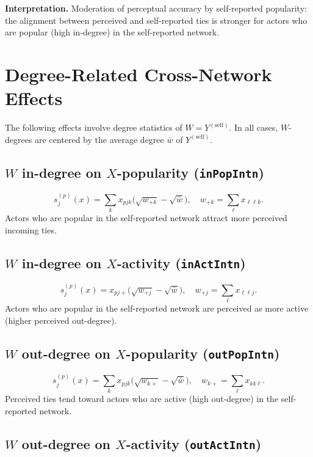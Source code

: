 \documentclass[11pt]{article}
\newcommand{\self}{\mathrm{self}}
\begin{document}
\textbf{Interpretation.}
Moderation of perceptual accuracy by self-reported popularity:
the alignment between perceived and self-reported ties is
stronger for actors who are popular (high in-degree) in the
self-reported network.

\section{Degree-Related Cross-Network Effects}

The following effects involve degree statistics of $W = Y^{(\self)}$.
In all cases, $W$-degrees are centered by the average degree $\bar{w}$ of
$Y^{(\self)}$.

\subsection{$W$ in-degree on $X$-popularity (\texttt{inPopIntn})}

\[
  s_{j}^{(p)}(x) = \sum_{k} x_{pjk}
    \bigl(\sqrt{w_{+k}} - \sqrt{\bar{w}}\bigr),
  \quad
  w_{+k} = \sum_{\ell} x_{\ell\ell k}.
\]
Actors who are popular in the self-reported network attract more perceived
incoming ties.

\subsection{$W$ in-degree on $X$-activity (\texttt{inActIntn})}

\[
  s_{j}^{(p)}(x) = x_{pj+}
    \bigl(\sqrt{w_{+j}} - \sqrt{\bar{w}}\bigr),
  \quad
  w_{+j} = \sum_{\ell} x_{\ell\ell j}.
\]
Actors who are popular in the self-reported network are perceived as more
active (higher perceived out-degree).

\subsection{$W$ out-degree on $X$-popularity (\texttt{outPopIntn})}

\[
  s_{j}^{(p)}(x) = \sum_{k} x_{pjk}
    \bigl(\sqrt{w_{k+}} - \sqrt{\bar{w}}\bigr),
  \quad
  w_{k+} = \sum_{\ell} x_{kk\ell}.
\]
Perceived ties tend toward actors who are active (high out-degree)
in the self-reported network.

\subsection{$W$ out-degree on $X$-activity (\texttt{outActIntn})}
\end{document}
